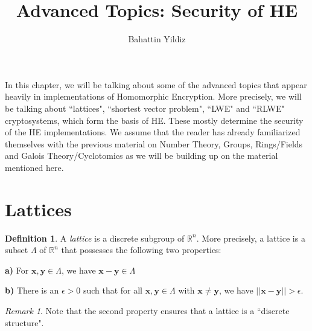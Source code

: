\documentclass[12pt]{article}
\title{Advanced Topics: Security of HE}
\author{Bahattin Yildiz }
\theoremstyle{plain}
\theoremstyle{definition}
\newtheorem{definition}{Definition}
\theoremstyle{remark}
\newtheorem{remark}{Remark}
\begin{document}
\date{}

\maketitle
In this chapter, we will be talking about some of the advanced topics that appear heavily in implementations of Homomorphic Encryption. More precisely, we will be talking about ``lattices", ``shortest vector problem", ``LWE" and ``RLWE" cryptosystems, which form the basis of HE. These mostly determine the security of the HE implementations. We assume that the reader has already familiarized themselves with the previous material on Number Theory, Groups, Rings/Fields and Galois Theory/Cyclotomics as we will be building up on the material mentioned here. 


 \section{Lattices}
\begin{definition}
A {\it lattice} is a discrete subgroup of $\mathbb{R}^n$. More precisely, a lattice is a subset $\Lambda$ of $\mathbb{R}^n$ that possesses the following two properties:
\par {\bf a)} For $\mathbf{x}, \mathbf{y} \in \Lambda$, we have $\mathbf{x}-\mathbf{y}\in \Lambda$ 
\par {\bf b)} There is an $\epsilon >0$ such that for all $\mathbf{x},\mathbf{y} \in \Lambda$ with $\mathbf{x}\neq \mathbf{y}$, we have $||\mathbf{x}-\mathbf{y}||>\epsilon$. 
\end{definition}
\begin{remark}
Note that the second property ensures that a lattice is a ``discrete structure". 
\end{remark}
\end{document}
